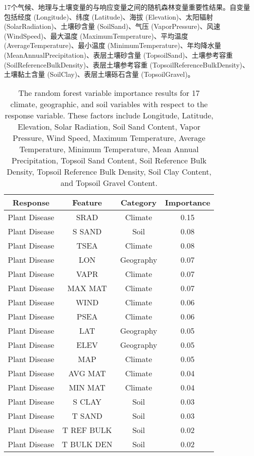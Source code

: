 \documentclass[AutoFakeBold]{LZUThesis-PgD&PhD}
\begin{document}
	
	\begin{table}[H]
		\caption{17个气候、地理与土壤变量的与响应变量之间的随机森林变量重要性结果。自变量包括经度 (Longitude)、纬度 (Latitude)、海拔 (Elevation)、太阳辐射 (SolarRadiation)、土壤砂含量 (SoilSand)、气压 (VaporPressure)、风速 (WindSpeed)、最大温度 (MaximumTemperature)、平均温度 (AverageTemperature)、最小温度 (MinimumTemperature)、年均降水量 (MeanAnnualPrecipitation)、表层土壤砂含量 (TopsoilSand)、土壤参考容重 (SoilReferenceBulkDensity)、表层土壤参考容重 (TopsoilReferenceBulkDensity)、土壤黏土含量 (SoilClay)、表层土壤砾石含量 (TopsoilGravel)。}
		\caption*{The random forest variable importance results for 17 climate, geographic, and soil variables with respect to the response variable. These factors include Longitude, Latitude, Elevation, Solar Radiation, Soil Sand Content, Vapor Pressure, Wind Speed, Maximum Temperature, Average Temperature, Minimum Temperature, Mean Annual Precipitation, Topsoil Sand Content, Soil Reference Bulk Density, Topsoil Reference Bulk Density, Soil Clay Content, and Topsoil Gravel Content.}
		\label{tab:feature_importance}
		\begin{tabular}{cccc}
			\toprule
			Response & Feature & Category & Importance \\
			\midrule
			Plant Disease & SRAD & Climate & 0.15 \\
			Plant Disease & S SAND & Soil & 0.08 \\
			Plant Disease & TSEA & Climate & 0.08 \\
			Plant Disease & LON & Geography & 0.07 \\
			Plant Disease & VAPR & Climate & 0.07 \\
			Plant Disease & MAX MAT & Climate & 0.07 \\
			Plant Disease & WIND & Climate & 0.06 \\
			Plant Disease & PSEA & Climate & 0.06 \\
			Plant Disease & LAT & Geography & 0.05 \\
			Plant Disease & ELEV & Geography & 0.05 \\
			Plant Disease & MAP & Climate & 0.05 \\
			Plant Disease & AVG MAT & Climate & 0.04 \\
			Plant Disease & MIN MAT & Climate & 0.04 \\
			Plant Disease & S CLAY & Soil & 0.03 \\
			Plant Disease & T SAND & Soil & 0.03 \\
			Plant Disease & T REF BULK & Soil & 0.02 \\
			Plant Disease & T BULK DEN & Soil & 0.02 \\
			\bottomrule
		\end{tabular}
	\end{table}
	
\end{document}

